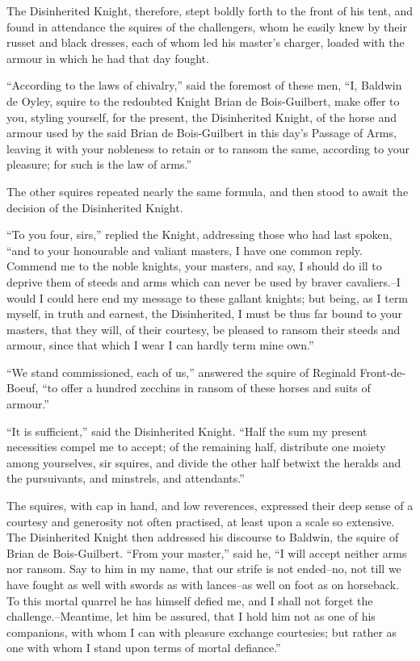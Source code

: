 The Disinherited Knight, therefore, stept boldly forth to the front of
his tent, and found in attendance the squires of the challengers, whom
he easily knew by their russet and black dresses, each of whom led his
master's charger, loaded with the armour in which he had that day
fought.

``According to the laws of chivalry,'' said the foremost of these men,
``I, Baldwin de Oyley, squire to the redoubted Knight Brian de
Bois-Guilbert, make offer to you, styling yourself, for the present, the
Disinherited Knight, of the horse and armour used by the said Brian de
Bois-Guilbert in this day's Passage of Arms, leaving it with your
nobleness to retain or to ransom the same, according to your pleasure;
for such is the law of arms.''

The other squires repeated nearly the same formula, and then stood to
await the decision of the Disinherited Knight.

``To you four, sirs,'' replied the Knight, addressing those who had last
spoken, ``and to your honourable and valiant masters, I have one common
reply. Commend me to the noble knights, your masters, and say, I should
do ill to deprive them of steeds and arms which can never be used by
braver cavaliers.--I would I could here end my message to these gallant
knights; but being, as I term myself, in truth and earnest, the
Disinherited, I must be thus far bound to your masters, that they will,
of their courtesy, be pleased to ransom their steeds and armour, since
that which I wear I can hardly term mine own.''

``We stand commissioned, each of us,'' answered the squire of Reginald
Front-de-Boeuf, ``to offer a hundred zecchins in ransom of these horses
and suits of armour.''

``It is sufficient,'' said the Disinherited Knight. ``Half the sum my
present necessities compel me to accept; of the remaining half,
distribute one moiety among yourselves, sir squires, and divide the
other half betwixt the heralds and the pursuivants, and minstrels, and
attendants.''

The squires, with cap in hand, and low reverences, expressed their deep
sense of a courtesy and generosity not often practised, at least upon a
scale so extensive. The Disinherited Knight then addressed his discourse
to Baldwin, the squire of Brian de Bois-Guilbert. ``From your master,''
said he, ``I will accept neither arms nor ransom. Say to him in my name,
that our strife is not ended--no, not till we have fought as well with
swords as with lances--as well on foot as on horseback. To this mortal
quarrel he has himself defied me, and I shall not forget the
challenge.--Meantime, let him be assured, that I hold him not as one of
his companions, with whom I can with pleasure exchange courtesies; but
rather as one with whom I stand upon terms of mortal defiance.''

